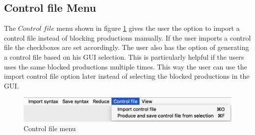 \subsection{Control file Menu}\label{sec:ConceptGUIControlFileMenu}

The $Control\;file$ menu shown in figure \ref{fig:ControlFileMenu} gives the user the option to import a control file instead of blocking productions manually. If the user imports a control file the checkboxes are set accordingly.
The user also has the option of generating a control file based on his GUI selection. This is particularly helpful if the users uses the same blocked productions multiple times. This way the user can use the import control file option later instead of selecting the blocked productions in the GUI.

\begin{figure}[H]
\centering
\includegraphics[width=.7\textwidth]{images/control_file_menu.png}
\caption{Control file menu}
\label{fig:ControlFileMenu}
\end{figure}

